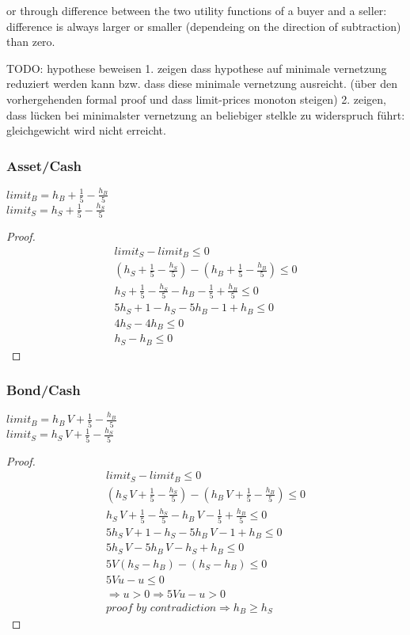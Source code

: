 \documentclass[Bachelorarbeit.tex]{subfiles}
\begin{document}
or through difference between the two utility functions of a buyer and a seller: difference is always larger or smaller (dependeing on the direction of subtraction) than zero.

TODO: hypothese beweisen
1. zeigen dass hypothese auf minimale vernetzung reduziert werden kann bzw. dass diese minimale vernetzung ausreicht. (über den vorhergehenden formal proof und dass limit-prices monoton steigen)
2. zeigen, dass lücken bei minimalster vernetzung an beliebiger stelkle zu widerspruch führt: gleichgewicht wird nicht erreicht. 

\subsubsection{Asset/Cash}
$limit_B = h_B + \frac{1}{5} - \frac{h_B}{5}$ \\
$limit_S = h_S + \frac{1}{5} - \frac{h_S}{5}$

\begin{proof}
\begin{align*}
	limit_S - limit_B \leq 0
	\\ (h_S + \frac{1}{5} - \frac{h_S}{5}) - ( h_B + \frac{1}{5} - \frac{h_B}{5} ) \leq 0
	\\ h_S + \frac{1}{5} - \frac{h_S}{5} - h_B - \frac{1}{5} + \frac{h_B}{5} \leq 0
	\\ 5h_S + 1 - h_S - 5h_B - 1 + h_B \leq 0
	\\ 4h_S - 4h_B \leq 0
	\\ h_S - h_B \leq 0		\tag*{can only hold if $h_B \geq h_S$}
\end{align*}
\end{proof}

\pagebreak
\subsubsection{Bond/Cash}
$limit_B = h_B \, V + \frac{1}{5} - \frac{h_B}{5}$ \\
$limit_S = h_S \, V + \frac{1}{5} - \frac{h_S}{5}$

\begin{proof}
\begin{align*}
	limit_S - limit_B \leq 0
	\\ (h_S \, V  + \frac{1}{5} - \frac{h_S}{5}) - ( h_B \, V  + \frac{1}{5} - \frac{h_B}{5} ) \leq 0
	\\ h_S \, V  + \frac{1}{5} - \frac{h_S}{5} -  h_B \, V  - \frac{1}{5} + \frac{h_B}{5} \leq 0
	\\ 5 h_S \, V  + 1 - h_S - 5h_B \, V  - 1 + h_B \leq 0
	\\ 5 h_S \, V - 5h_B \, V - h_S + h_B \leq 0
	\\ 5V(h_S - h_B) - (h_S - h_B) \leq 0	\tag*{substituting $u = (h_S - h_B)$}
	\\ 5Vu - u \leq 0	\tag*{assuming $h_S > h_B$}	
	\\ \Rightarrow u > 0 \Rightarrow 5Vu - u > 0 		\tag*{violates the original assumption}	
	\\ \textit{proof by contradiction} \Rightarrow h_B \geq h_S
\end{align*}
\end{proof}
\end{document}
